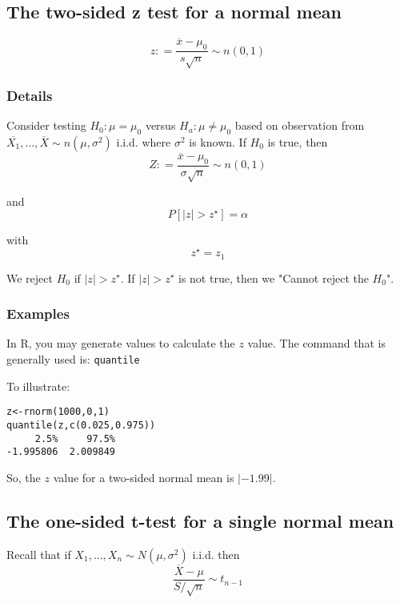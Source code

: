 \documentclass[12pt,a4paper]{article}
\theoremstyle{regla}
\theoremstyle{remark}
\theoremstyle{definition}
\theoremstyle{nonumberbreak}
\begin{document}
\subsection{The two-sided z test for a normal mean}
\begin{fbox}
\begin{minipage}{0.97\textwidth}
$$z: =\frac{\overline{x}-\mu_0}{s\sqrt{n}} \sim n(0,1)$$
\end{minipage}
\end{fbox}
\subsubsection{Details}
Consider testing $H_0: \mu=\mu_0$ versus $H_a: \mu \ne \mu_0$ based on observation from $\overline{X_1},..., \overline{X} \sim n(\mu, \sigma^2)$  i.i.d. where $\sigma^2$ is known.  If $H_0$ is true, then
$$Z: = \frac{\overline{x}-\mu_0}{\sigma \sqrt{n}} \sim n(0,1)$$

and
$$P[|z| > z^\star] = \alpha$$

with $$z^\star = z_{1}$$

We reject $H_0$ if $|z| > z^\star$. If $|z| > z^\star$ is not true, then we "Cannot reject the $H_0$".




 
\subsubsection{Examples}
\begin{xmpl}

In R, you may generate values to calculate the $z$ value. The command that is generally used is: \texttt {quantile}  

To illustrate: 

\begin{lstlisting}
z<-rnorm(1000,0,1)
quantile(z,c(0.025,0.975))
     2.5%     97.5% 
-1.995806  2.009849 
\end{lstlisting}

So, the $z$ value for a two-sided normal mean is $\left |-1.99 \right |$.  
\end{xmpl}

\subsection{The one-sided t-test for a single normal mean}
\begin{fbox}
\begin{minipage}{0.97\textwidth}
Recall that if $X_1,...,X_n \sim N(\mu,\sigma^2)$ i.i.d. then $$\frac{\overline{X}-\mu}{S/\sqrt{n}}\sim t_{n-1}$$
\end{minipage}
\end{fbox}
\end{document}

